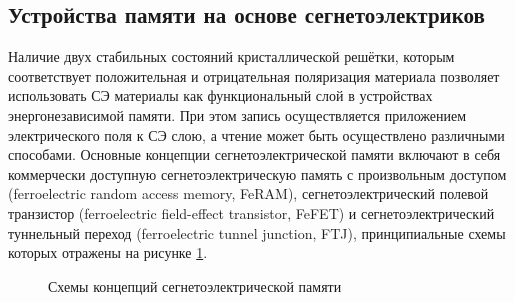 \subsection{Устройства памяти на основе сегнетоэлектриков}
Наличие двух стабильных состояний кристаллической решётки, которым соответствует положительная и отрицательная поляризация материала  позволяет использовать СЭ материалы как функциональный слой в устройствах энергонезависимой памяти. При этом запись осуществляется приложением электрического поля к СЭ слою, а чтение может быть осуществлено различными способами. Основные концепции сегнетоэлектрической памяти включают в себя коммерчески доступную сегнетоэлектрическую память с произвольным доступом (ferroelectric random access memory, FeRAM), сегнетоэлектрический полевой транзистор (ferroelectric field-effect transistor, FeFET) и сегнетоэлектрический туннельный переход (ferroelectric tunnel junction, FTJ), принципиальные схемы которых отражены на рисунке \cref{fig:FeRAM}. 

\begin{figure}[ht]
    \caption{Схемы концепций сегнетоэлектрической памяти \cite{schroederFundamentalsApplicationsFerroelectric2022}}\label{fig:FeRAM}
\end{figure}

\FloatBarrier
